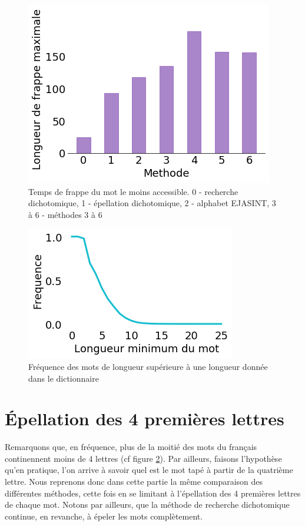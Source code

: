 \documentclass[twoside,twocolumn]{article}
\begin{document}
\begin{center}
\begin{figure}
  \includegraphics[scale=0.5]{frappe-maxi.png}
  \caption{Temps de frappe du mot le moins accessible. 0 - recherche dichotomique, 1 - épellation dichotomique, 2 - alphabet EJASINT, 3 à 6 - méthodes 3 à 6}
  \label{maxi}
\end{figure}
\end{center}
\begin{center}
\begin{figure}
  \includegraphics[scale=0.55]{dico.png}
  \caption{Fréquence des mots de longueur supérieure à une longueur donnée dans le dictionnaire}
  \label{dico}
\end{figure}
\end{center}
\section{Épellation des 4 premières lettres}

Remarquons que, en fréquence, plus de la moitié des mots du français continennent moins de 4 lettres (cf figure \ref{dico}). Par ailleurs, faisons l'hypothèse qu'en pratique, l'on arrive à savoir quel est le mot tapé à partir de la quatrième lettre. Nous reprenons donc dans cette partie la même comparaison des différentes méthodes, cette fois en se limitant à l'épellation des 4 premières lettres de chaque mot. Notons par ailleurs, que la méthode de recherche dichotomique continue, en revanche, à épeler les mots complètement.
\end{document}
